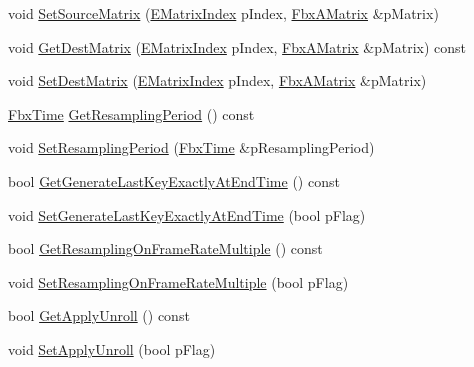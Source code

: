 \begin{DoxyCompactItemize}
\item 
void \hyperlink{class_fbx_anim_curve_filter_matrix_converter_a51f8c45cecbe23a5df38bd0f2b4feb08}{Set\+Source\+Matrix} (\hyperlink{class_fbx_anim_curve_filter_matrix_converter_a41638d5acd6d14ef0f095ab75b18ee69}{E\+Matrix\+Index} p\+Index, \hyperlink{class_fbx_a_matrix}{Fbx\+A\+Matrix} \&p\+Matrix)
\item 
void \hyperlink{class_fbx_anim_curve_filter_matrix_converter_a5cd3e587cb299a3ae2d78e9c964a5ef0}{Get\+Dest\+Matrix} (\hyperlink{class_fbx_anim_curve_filter_matrix_converter_a41638d5acd6d14ef0f095ab75b18ee69}{E\+Matrix\+Index} p\+Index, \hyperlink{class_fbx_a_matrix}{Fbx\+A\+Matrix} \&p\+Matrix) const
\item 
void \hyperlink{class_fbx_anim_curve_filter_matrix_converter_a5eafea6927cc0698df3a1a9c2cdb3b7d}{Set\+Dest\+Matrix} (\hyperlink{class_fbx_anim_curve_filter_matrix_converter_a41638d5acd6d14ef0f095ab75b18ee69}{E\+Matrix\+Index} p\+Index, \hyperlink{class_fbx_a_matrix}{Fbx\+A\+Matrix} \&p\+Matrix)
\item 
\hyperlink{class_fbx_time}{Fbx\+Time} \hyperlink{class_fbx_anim_curve_filter_matrix_converter_a30366999bdf8a54362cb07415cb09d67}{Get\+Resampling\+Period} () const
\item 
void \hyperlink{class_fbx_anim_curve_filter_matrix_converter_ad32f07496ccaa59ed3fa575da58b5dc1}{Set\+Resampling\+Period} (\hyperlink{class_fbx_time}{Fbx\+Time} \&p\+Resampling\+Period)
\item 
bool \hyperlink{class_fbx_anim_curve_filter_matrix_converter_a2721fda063f33bb95358c60df9a935f7}{Get\+Generate\+Last\+Key\+Exactly\+At\+End\+Time} () const
\item 
void \hyperlink{class_fbx_anim_curve_filter_matrix_converter_a3f6bbf821eff2180bef5b63764d4a305}{Set\+Generate\+Last\+Key\+Exactly\+At\+End\+Time} (bool p\+Flag)
\item 
bool \hyperlink{class_fbx_anim_curve_filter_matrix_converter_a6f5d905229e996ddccfe96e2cd4454e3}{Get\+Resampling\+On\+Frame\+Rate\+Multiple} () const
\item 
void \hyperlink{class_fbx_anim_curve_filter_matrix_converter_a7b23dfad34cae6de4c7f20ea8c071633}{Set\+Resampling\+On\+Frame\+Rate\+Multiple} (bool p\+Flag)
\item 
bool \hyperlink{class_fbx_anim_curve_filter_matrix_converter_acf269bdba7f9526a1c957505cb3beb9c}{Get\+Apply\+Unroll} () const
\item 
void \hyperlink{class_fbx_anim_curve_filter_matrix_converter_abcfe379526feec5a8d3ffc9e3e435d66}{Set\+Apply\+Unroll} (bool p\+Flag)

\end{DoxyCompactItemize}
